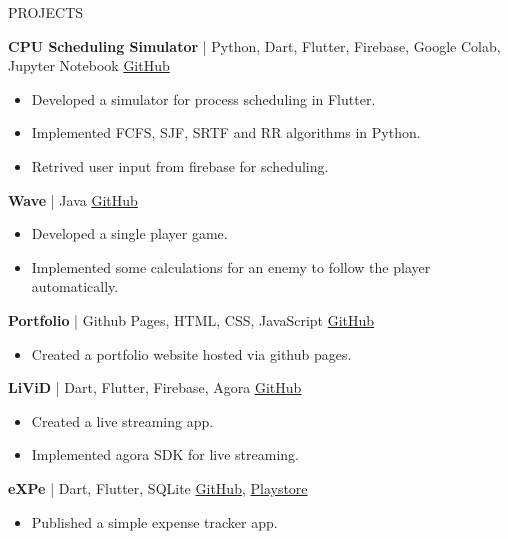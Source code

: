 \documentclass{resume} %
\begin{document}
\begin{rSection}{PROJECTS}
\item \textbf{CPU Scheduling Simulator} | {Python, Dart, Flutter, Firebase, Google Colab, Jupyter Notebook} \hfill \href{https://github.com/JayNakum/OperatingSystemsProject}{GitHub}
\begin{itemize}
    \itemsep -3pt {} 
    \item Developed a simulator for process scheduling in Flutter.
    \item Implemented FCFS, SJF, SRTF and RR algorithms in Python.
    \item Retrived user input from firebase for scheduling.
 \end{itemize}
\item \textbf{Wave} | {Java} \hfill \href{https://github.com/JayNakum/Wave}{GitHub}
\begin{itemize}
    \itemsep -3pt {} 
    \item Developed a single player game.
    \item Implemented some calculations for an enemy to follow the player automatically.
 \end{itemize}
\item \textbf{Portfolio} | {Github Pages, HTML, CSS, JavaScript} \hfill \href{https://github.com/JayNakum/JayNakum.github.io}{GitHub}
\begin{itemize}
    \itemsep -3pt {} 
    \item Created a portfolio website hosted via github pages.
 \end{itemize}
\item \textbf{LiViD} | {Dart, Flutter, Firebase, Agora} \hfill \href{https://github.com/JayNakum/LiViD}{GitHub}
\begin{itemize}
    \itemsep -3pt {} 
     \item Created a live streaming app.
    \item Implemented agora SDK for live streaming.
 \end{itemize}
\item \textbf{eXPe} | {Dart, Flutter, SQLite} \hfill \href{https://github.com/JayNakum/eXPe}{GitHub}, \href{https://play.google.com/store/apps/details?id=io.github.jaynakum.expe&pcampaignid=pcampaignidMKT-Other-global-all-co-prtnr-py-PartBadge-Mar2515-1}{Playstore}
\begin{itemize}
    \itemsep -3pt {} 
     \item Published a simple expense tracker app.
 \end{itemize}
\end{rSection} 
\end{document}
